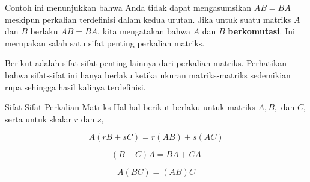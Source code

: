 Contoh ini menunjukkan bahwa Anda tidak dapat mengasumsikan $AB=BA$ meskipun
perkalian terdefinisi dalam kedua urutan. Jika untuk suatu matriks $A$ dan
$B$ berlaku $AB=BA$, kita mengatakan bahwa $A$ dan $B$ \textbf{berkomutasi}. Ini merupakan salah satu
sifat penting perkalian matriks.

Berikut adalah sifat-sifat penting lainnya dari perkalian matriks.
Perhatikan bahwa sifat-sifat ini hanya berlaku ketika ukuran matriks-matriks sedemikian rupa sehingga hasil kalinya terdefinisi. 

\begin{proposition}{Sifat-Sifat Perkalian Matriks}\label{prop:propertiesofmatrixmultiplication}
Hal-hal berikut berlaku  untuk matriks $A,B,$ dan $C$, serta untuk skalar $r$ dan $s$,

\begin{equation}
A\left( rB+sC\right) =r\left( AB\right) +s\left( AC\right)  \label{matrixproperties1}
\end{equation}

\begin{equation}
\left( B+C\right) A=BA+CA  \label{matrixproperties2}
\end{equation}

\begin{equation}
A\left( BC\right) =\left( AB\right) C  \label{matrixproperties3}
\end{equation}
\end{proposition}

